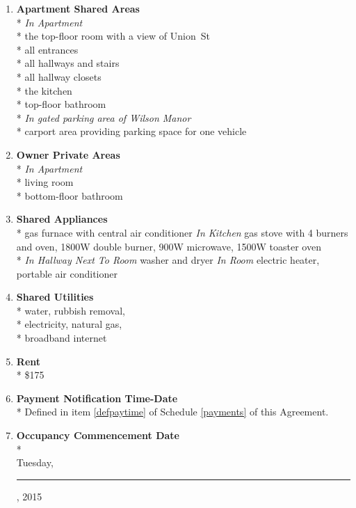 \documentclass[12pt,letterpaper]{article}
\newcommand{\datefillin}{\hspace{0.2cm}\rule{3cm}{.1pt}}
\newcommand{\condo}{Wilson Manor}
\newcommand{\apt}{Apartment}
\newcommand{\room}{Room}
\newcommand{\shared}{Apartment Shared Areas}
\newcommand{\livingroom}{Owner Private Areas}
\newcommand{\appliances}{Shared Appliances}
\newcommand{\utilities}{Shared Utilities}
\newcommand{\firstday}{Occupancy Commencement Date}
\newcommand{\rent}{\$175}
\newcommand{\paymenttime}{Payment Notification Time-Date}
\begin{document}
\begin{multicols}{2}
\begin{enumerate}
		\item \textbf{\shared{}}\\* \label{shared}
			\textit{In \apt{}}\\*
			the top-floor room with a view of Union~St\\*
			all entrances\\*
			all hallways and stairs\\*
			all hallway closets\\*
			the kitchen\\*
			top-floor bathroom\\*
			\textit{In gated parking area of \condo{}}\\*
			carport area providing parking space for one vehicle
			
		\item \textbf{\livingroom{}}\\* \label{livingroom}
			\textit{In \apt{}}\\*
			living room\\*
			bottom-floor bathroom
			
		\item \textbf{\appliances}\\* \label{appliances}
			gas furnace with central air conditioner
			\textit{In Kitchen}  
			gas stove with 4 burners and oven, 
			1800W double burner,
			900W microwave,
			1500W toaster oven\\*
			\textit{In Hallway Next To \room{}} washer and dryer
			\textit{In \room{}} electric heater,
			portable air conditioner
			
		\item \textbf{\utilities{}}\\* \label{utilities}
			water,
			rubbish removal,\\*
			electricity,
			natural gas,\\*
			broadband internet

		\item \textbf{Rent}\\* \label{rent}
			\rent{}

		\item \textbf{\paymenttime{}}\\* \label{paymenttime}
			Defined in item \ref{defpaytime} of Schedule \ref{payments} of this Agreement.

		\item \textbf{\firstday{}} \label{firstday} \\* \\
			Tuesday, \datefillin, 2015


\end{enumerate}
\end{multicols}
\end{document}
